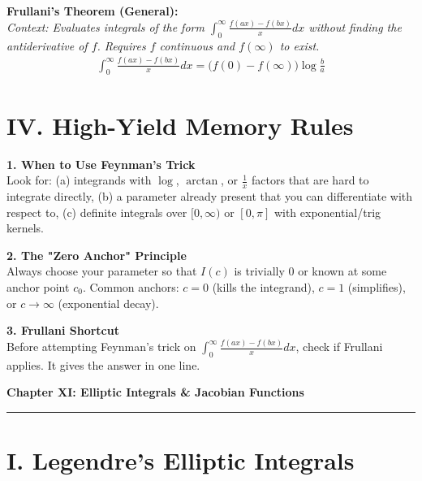 \documentclass[11pt, a4paper]{article}
\begin{document}
\vspace{0.2cm}

\textbf{\color{accent}Frullani's Theorem (General):}\\
\textit{\small Context: Evaluates integrals of the form $\int_0^\infty \frac{f(ax)-f(bx)}{x}dx$ without finding the antiderivative of $f$. Requires $f$ continuous and $f(\infty)$ to exist.}
\begin{align*}
    \int_0^\infty \frac{f(ax)-f(bx)}{x} dx = \big(f(0) - f(\infty)\big) \log \frac{b}{a}
\end{align*}

\vspace{0.3cm}

\section*{\color{primary} IV. High-Yield Memory Rules}

\textbf{1. When to Use Feynman's Trick}\\
Look for: (a) integrands with $\log$, $\arctan$, or $\frac{1}{x}$ factors that are hard to integrate directly, (b) a parameter already present that you can differentiate with respect to, (c) definite integrals over $[0,\infty)$ or $[0,\pi]$ with exponential/trig kernels.

\textbf{2. The "Zero Anchor" Principle}\\
Always choose your parameter so that $I(c)$ is trivially $0$ or known at some anchor point $c_0$. Common anchors: $c=0$ (kills the integrand), $c=1$ (simplifies), or $c \to \infty$ (exponential decay).

\textbf{3. Frullani Shortcut}\\
Before attempting Feynman's trick on $\int_0^\infty \frac{f(ax)-f(bx)}{x}dx$, check if Frullani applies. It gives the answer in one line.

\newpage

\begin{center}
    {\LARGE \bfseries \color{accent} Chapter XI: Elliptic Integrals \& Jacobian Functions}\\
    \vspace{0.2cm}
    {\color{accent}\rule{0.55\linewidth}{0.8pt}}
\end{center}
\vspace{0.35cm}


\section*{\color{primary} I. Legendre's Elliptic Integrals}
\end{document}
